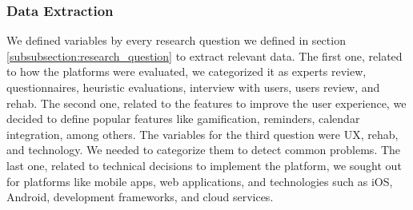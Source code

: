 \documentclass[conference]{IEEEtran}
\begin{document}
\subsubsection{Data Extraction}
We defined variables by every research question we defined in section \ref{subsubsection:research_question} to extract relevant data. The first one, related to how the platforms were evaluated, we categorized it as experts review, questionnaires, heuristic evaluations, interview with users, users review, and rehab. The second one, related to the features to improve the user experience, we decided to define popular features like gamification, reminders, calendar integration, among others. The variables for the third question were UX, rehab, and technology. We needed to categorize them to detect common problems. The last one, related to technical decisions to implement the platform, we sought out for platforms like mobile apps, web applications, and technologies such as iOS, Android, development frameworks, and cloud services. 


\begin{comment}

\end{comment}



\end{document}

